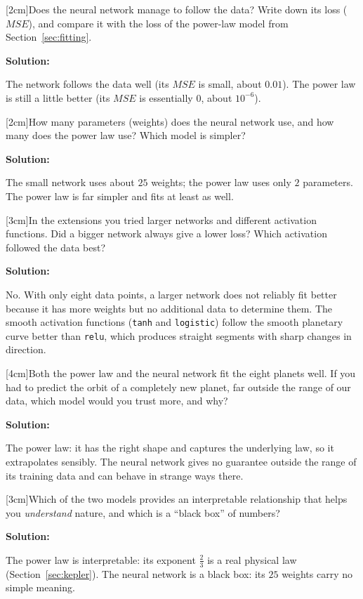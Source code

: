 \documentclass[12pt]{article}
\makeatletter
\newcounter{question}
\newlength\questionheight
\newcommand{\question}{\@ifstar{\question@text}{\question@field}}
\newcommand{\question@heading}[1]{%
  \refstepcounter{question}%
  \vspace{0.3cm}%
  \noindent\textbf{\faEdit\ Question \thequestion: #1}%
}
\newcommand{\question@text}[1]{%
  \question@heading{#1}%
}
\newcommand{\question@field}[2][\questionheight]{%
  \question@heading{#2}%
 \\[0.3em] \begin{Form}
    \TextField[
      name=Q\thequestion,
      multiline=true,
      width=\linewidth,
      height=#1,
      charsize=10pt,
      bordercolor={0 0 0},
      borderwidth=1.8,
      backgroundcolor={1 1 1}
    ]{}
  \end{Form}
  \vspace{0.3cm}%
}
\newenvironment{solution}{%
  \begin{solutionbox}\textbf{Solution:}
}{%
  \end{solutionbox}
}
\makeatother
\begin{document}
\question[2cm]{Does the neural network manage to follow the data? Write down its loss ($MSE$), and compare it with the loss of the power-law model from Section~\ref{sec:fitting}.}

\begin{solution}
The network follows the data well (its $MSE$ is small, about $0.01$). The power law is still a little better (its $MSE$ is essentially $0$, about $10^{-6}$).
\end{solution}

\question[2cm]{How many parameters (weights) does the neural network use, and how many does the power law use? Which model is simpler?}

\begin{solution}
The small network uses about $25$ weights; the power law uses only $2$ parameters. The power law is far simpler and fits at least as well.
\end{solution}

\question[3cm]{In the extensions you tried larger networks and different activation functions. Did a bigger network always give a lower loss? Which activation followed the data best?}

\begin{solution}
No. With only eight data points, a larger network does not reliably fit better because it has more weights but no additional data to determine them. The smooth activation functions (\texttt{tanh} and \texttt{logistic}) follow the smooth planetary curve better than \texttt{relu}, which produces straight segments with sharp changes in direction.
\end{solution}

\question[4cm]{Both the power law and the neural network fit the eight planets well. If you had to predict the orbit of a completely new planet, far outside the range of our data, which model would you trust more, and why?}

\begin{solution}
The power law: it has the right shape and captures the underlying law, so it extrapolates sensibly. The neural network gives no guarantee outside the range of its training data and can behave in strange ways there.
\end{solution}

\question[3cm]{Which of the two models provides an interpretable relationship that helps you \emph{understand} nature, and which is a ``black box'' of numbers?}

\begin{solution}
The power law is interpretable: its exponent $\tfrac{2}{3}$ is a real physical law (Section~\ref{sec:kepler}). The neural network is a black box: its $25$ weights carry no simple meaning.
\end{solution}
\end{document}
